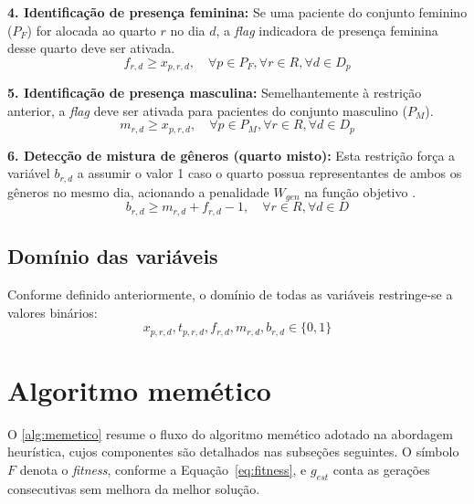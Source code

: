 \textbf{4. Identificação de presença feminina:} Se uma paciente do conjunto feminino ($P_F$) for alocada ao quarto $r$ no dia $d$, a \textit{flag} indicadora de presença feminina desse quarto deve ser ativada.
\begin{equation}
f_{r,d} \geq x_{p,r,d}, \quad \forall p \in P_F, \forall r \in R, \forall d \in D_p
\label{eq:presenca-feminina}
\end{equation}

\textbf{5. Identificação de presença masculina:} Semelhantemente à restrição anterior, a \textit{flag} deve ser ativada para pacientes do conjunto masculino ($P_M$).
\begin{equation}
m_{r,d} \geq x_{p,r,d}, \quad \forall p \in P_M, \forall r \in R, \forall d \in D_p
\label{eq:presenca-masculina}
\end{equation}

\textbf{6. Detecção de mistura de gêneros (quarto misto):} Esta restrição força a variável $b_{r,d}$ a assumir o valor 1 caso o quarto possua representantes de ambos os gêneros no mesmo dia, acionando a penalidade $W_{gen}$ na função objetivo \cite{ceschia2011local}.
\begin{equation}
b_{r,d} \geq m_{r,d} + f_{r,d} - 1, \quad \forall r \in R, \forall d \in D
\label{eq:quarto-misto}
\end{equation}

\subsection{Domínio das variáveis}
Conforme definido anteriormente, o domínio de todas as variáveis restringe-se a valores binários:
\begin{equation}
x_{p,r,d}, t_{p,r,d}, f_{r,d}, m_{r,d}, b_{r,d} \in \{0,1\}
\end{equation}


\section{Algoritmo memético}
\label{sec:algoritmo-memetico}

O \autoref{alg:memetico} resume o fluxo do algoritmo memético adotado na abordagem heurística, cujos componentes são detalhados nas subseções seguintes. O símbolo $F$ denota o \textit{fitness}, conforme a Equação~\eqref{eq:fitness}, e $g_{est}$ conta as gerações consecutivas sem melhora da melhor solução.

